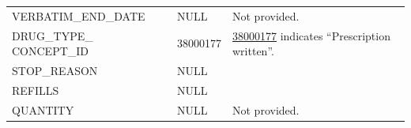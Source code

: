 \documentclass[11pt]{book}
\theoremstyle{definition}
\theoremstyle{definition}
\theoremstyle{definition}
\theoremstyle{remark}
\begin{document}
\begin{longtable}[]{@{}lll@{}}
\begin{minipage}[t]{0.28\columnwidth}\raggedright\strut
VERBATIM\_END\_DATE\strut
\end{minipage} & \begin{minipage}[t]{0.16\columnwidth}\raggedright\strut
NULL\strut
\end{minipage} & \begin{minipage}[t]{0.48\columnwidth}\raggedright\strut
Not provided.\strut
\end{minipage}\tabularnewline
\begin{minipage}[t]{0.28\columnwidth}\raggedright\strut
DRUG\_TYPE\_ CONCEPT\_ID\strut
\end{minipage} & \begin{minipage}[t]{0.16\columnwidth}\raggedright\strut
38000177\strut
\end{minipage} & \begin{minipage}[t]{0.48\columnwidth}\raggedright\strut
\href{http://athena.ohdsi.org/search-terms/terms/38000177}{38000177}
indicates ``Prescription written''.\strut
\end{minipage}\tabularnewline
\begin{minipage}[t]{0.28\columnwidth}\raggedright\strut
STOP\_REASON\strut
\end{minipage} & \begin{minipage}[t]{0.16\columnwidth}\raggedright\strut
NULL\strut
\end{minipage} & \begin{minipage}[t]{0.48\columnwidth}\raggedright\strut
\strut
\end{minipage}\tabularnewline
\begin{minipage}[t]{0.28\columnwidth}\raggedright\strut
REFILLS\strut
\end{minipage} & \begin{minipage}[t]{0.16\columnwidth}\raggedright\strut
NULL\strut
\end{minipage} & \begin{minipage}[t]{0.48\columnwidth}\raggedright\strut
\strut
\end{minipage}\tabularnewline
\begin{minipage}[t]{0.28\columnwidth}\raggedright\strut
QUANTITY\strut
\end{minipage} & \begin{minipage}[t]{0.16\columnwidth}\raggedright\strut
NULL\strut
\end{minipage} & \begin{minipage}[t]{0.48\columnwidth}\raggedright\strut
Not provided.\strut

\end{minipage}
\end{longtable}
\end{document}
